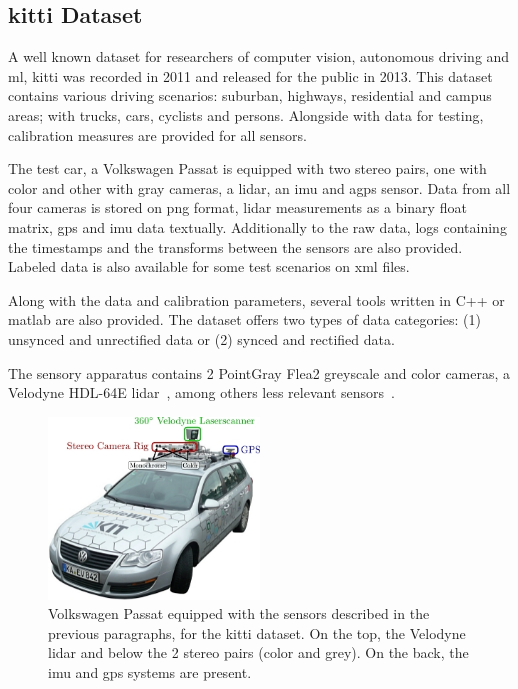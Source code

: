 \subsection{\acl{kitti} Dataset}
A well known dataset for researchers of computer vision, autonomous driving and \ac{ml}, \ac{kitti} was recorded in 2011 and released for the public in 2013. This dataset contains various driving scenarios: suburban, highways, residential and campus areas; with trucks, cars, cyclists and persons. Alongside with data for testing, calibration measures are provided for all sensors.

The test car, a Volkswagen Passat is equipped with two stereo pairs, one with color and other with gray cameras, a \ac{lidar}, an \ac{imu} and a\ac{gps} sensor. Data from all four cameras is stored on \ac{png} format, \ac{lidar} measurements as a binary float matrix, \ac{gps} and {imu} data textually. Additionally to the raw data, logs containing the timestamps and the transforms between the sensors are also provided. Labeled data is also available for some test scenarios on \ac{xml} files.

Along with the data and calibration parameters, several tools written in C++ or \ac{matlab} are also provided. The dataset offers two types of data categories: (1) unsynced and unrectified data or (2) synced and rectified data. 

The sensory apparatus contains 2 PointGray Flea2 greyscale and color cameras, a Velodyne HDL-64E \ac{lidar}~\cite{VelodyneHDL64}, among others less relevant sensors~\cite{Geiger2013a}.

\begin{figure}
	\centering
	\includegraphics[width=0.5\textwidth]{img/sensor_fusion/passat_sensors.jpg}
	\caption{Volkswagen Passat equipped with the sensors described in the previous paragraphs, for the \ac{kitti} dataset. On the top, the Velodyne \ac{lidar} and below the 2 stereo pairs (color and grey). On the back, the \ac{imu} and {gps} systems are present.}
	\label{fig:sota:kitti_sensors}
\end{figure}


